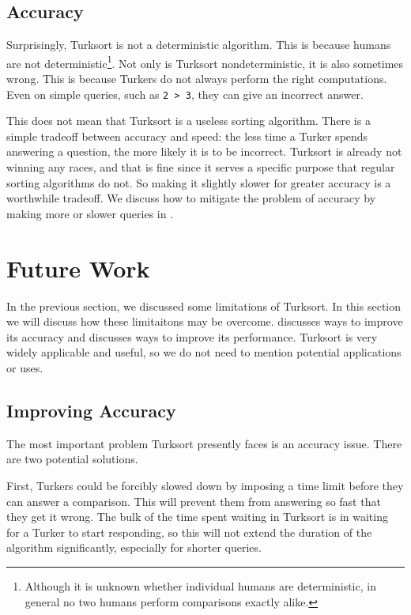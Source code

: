 \documentclass{article}
\begin{document}
\subsection{Accuracy}\label{sec:accuracy}
Surprisingly, Turksort is not a deterministic algorithm. This is because humans
are not deterministic\footnote{Although it is unknown whether individual humans
  are deterministic, in general no two humans perform comparisons exactly
  alike.}. Not only is Turksort nondeterministic, it is also sometimes wrong.
This is because Turkers do not always perform the right computations. Even on
simple queries, such as \texttt{2 > 3}, they can give an incorrect answer.

This does not mean that Turksort is a useless sorting algorithm. There is a
simple tradeoff between accuracy and speed: the less time a Turker spends
answering a question, the more likely it is to be incorrect. Turksort is already
not winning any races, and that is fine since it serves a specific purpose that
regular sorting algorithms do not. So making it slightly slower for greater
accuracy is a worthwhile tradeoff. We discuss how to mitigate the problem of
accuracy by making more or slower queries in .

\section{Future Work} \label{sec:future-work}
In the previous section, we discussed some limitations of Turksort. In this
section we will discuss how these limitaitons may be overcome.
 discusses ways to improve its accuracy and
 discusses ways to improve its performance.
Turksort is very widely applicable and useful, so we do not need to mention
potential applications or uses.

\subsection{Improving Accuracy}\label{sec:improving-accuracy}

The most important problem Turksort presently faces is an accuracy issue. There
are two potential solutions.

First, Turkers could be forcibly slowed down by imposing a time limit before
they can answer a comparison. This will prevent them from answering so fast that
they get it wrong. The bulk of the time spent waiting in Turksort is in waiting
for a Turker to start responding, so this will not extend the duration of the
algorithm significantly, especially for shorter queries.
\end{document}

